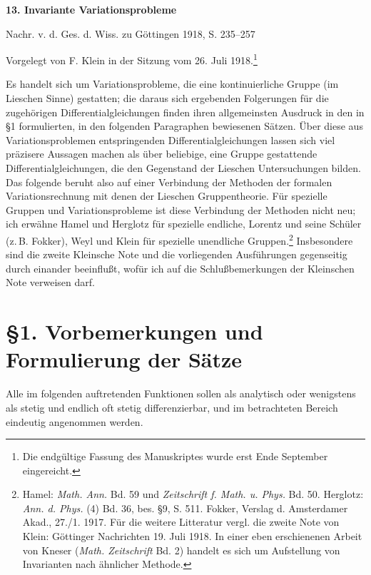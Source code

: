 \documentclass[11pt]{article}
\begin{document}
\begin{center}
{\Large\bfseries 13. Invariante Variationsprobleme}\par
\vspace{1.5em}
Nachr. v. d. Ges. d. Wiss. zu Göttingen 1918, S. 235--257
\end{center}

\vspace{3em}
\begin{center}
Vorgelegt von F. Klein in der Sitzung vom 26. Juli 1918.\footnote{Die endgültige Fassung des Manuskriptes wurde erst Ende September eingereicht.}
\end{center}

Es handelt sich um Variationsprobleme, die eine kontinuierliche Gruppe (im Lieschen Sinne) gestatten; die daraus sich ergebenden Folgerungen für die zugehörigen Differentialgleichungen finden ihren allgemeinsten Ausdruck in den in \S{}1 formulierten, in den folgenden Paragraphen bewiesenen Sätzen. Über diese aus Variationsproblemen entspringenden Differentialgleichungen lassen sich viel präzisere Aussagen machen als über beliebige, eine Gruppe gestattende Differentialgleichungen, die den Gegenstand der Lieschen Untersuchungen bilden. Das folgende beruht also auf einer Verbindung der Methoden der formalen Variationsrechnung mit denen der Lieschen Gruppentheorie. Für spezielle Gruppen und Variationsprobleme ist diese Verbindung der Methoden nicht neu; ich erwähne Hamel und Herglotz für spezielle endliche, Lorentz und seine Schüler (z.\,B. Fokker), Weyl und Klein für spezielle unendliche Gruppen.\footnote{Hamel: \emph{Math. Ann.} Bd. 59 und \emph{Zeitschrift f. Math. u. Phys.} Bd. 50. Herglotz: \emph{Ann. d. Phys.} (4) Bd. 36, bes. \S{}9, S. 511. Fokker, Verslag d. Amsterdamer Akad., 27./1. 1917. Für die weitere Litteratur vergl. die zweite Note von Klein: Göttinger Nachrichten 19. Juli 1918. In einer eben erschienenen Arbeit von Kneser (\emph{Math. Zeitschrift} Bd. 2) handelt es sich um Aufstellung von Invarianten nach ähnlicher Methode.} Insbesondere sind die zweite Kleinsche Note und die vorliegenden Ausführungen gegenseitig durch einander beeinflußt, wofür ich auf die Schlußbemerkungen der Kleinschen Note verweisen darf.

\section*{\S{}1. Vorbemerkungen und Formulierung der Sätze}

Alle im folgenden auftretenden Funktionen sollen als analytisch oder wenigstens als stetig und endlich oft stetig differenzierbar, und im betrachteten Bereich eindeutig angenommen werden.
\end{document}

